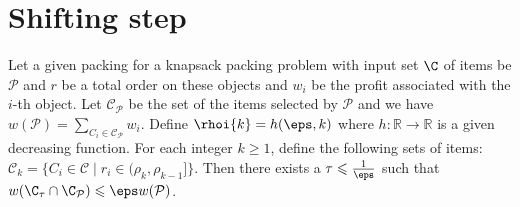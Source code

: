 

\section{Shifting step}\label{sec:shifting}
\begin{lem}
	\label{lem:shifting}
	Let a given packing for a knapsack packing problem with input set \(\C\) of items be $\mathcal{P}$ and \(r\) be a total order on these objects and \(w_i\) be the profit associated with the \(i\)-th object. Let $\mathcal{C}_{\mathcal{P}}$ be the set of the items selected by $\mathcal{P}$ and we have $w(\mathcal{P}) = \sum_{C_{i}\in \mathcal{C}_{\mathcal{P}}} w_{i}$. Define $\rhoi{k} = h(\eps, k)$ where $h: \mathbb{R} \rightarrow \mathbb{R}$ is a given decreasing function. For each integer \(k\geqslant 1\), define the following sets of items:
	\(
	\mathcal{C}_k = \{C_i \in \mathcal{C} \mid r_{i} \in (\rho_{k},\rho_{k-1}]\}.
	\)
	Then there exists a \(\tau \leqslant \frac{1}{\eps}\) such that \(w(\C_{\tau}\cap\C_{\mathcal{P}})\leqslant\eps w(\mathcal{P})\).
\end{lem}
